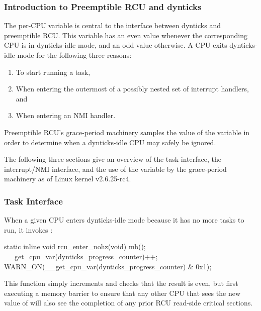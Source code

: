 \subsubsection{Introduction to Preemptible RCU and dynticks}
\label{sec:formal:Introduction to Preemptible RCU and dynticks}

The per-CPU  variable is
central to the interface between dynticks and preemptible RCU\@.
This variable has an even value whenever the corresponding CPU
is in dynticks-idle mode, and an odd value otherwise.
A CPU exits dynticks-idle mode for the following three reasons:

\begin{enumerate}
\item	To start running a task,
\item	When entering the outermost of a possibly nested set of interrupt
	handlers, and
\item	When entering an NMI handler.
\end{enumerate}

Preemptible RCU's grace-period machinery samples the value of
the  variable in order to
determine when a dynticks-idle CPU may safely be ignored.

The following three sections give an overview of the task
interface, the interrupt/NMI interface, and the use of
the  variable by the
grace-period machinery as of Linux kernel v2.6.25-rc4.

\subsubsection{Task Interface}
\label{sec:formal:Task Interface}

When a given CPU enters dynticks-idle mode because it has no more
tasks to run, it invokes :

\begin{VerbatimN}
static inline void rcu_enter_nohz(void)
{
	mb();
	__get_cpu_var(dynticks_progress_counter)++;
	WARN_ON(__get_cpu_var(dynticks_progress_counter) &
	        0x1);
}
\end{VerbatimN}

This function simply increments  and
checks that the result is even, but first executing a memory barrier
to ensure that any other CPU that sees the new value of
 will also see the completion
of any prior RCU read-side critical sections.


